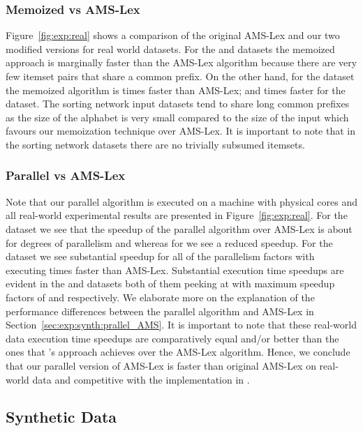 \documentclass[13pt,a4paper]{article}
\begin{document}
\subsubsection{Memoized vs AMS-Lex}

Figure~\ref{fig:exp:real} shows a comparison of the original AMS-Lex and our two modified versions for real world datasets. For the  and  datasets the memoized approach is marginally faster than the AMS-Lex algorithm because there are very few itemset pairs that share a common prefix. On the other hand, for the  dataset the memoized algorithm is  times faster than AMS-Lex; and  times faster for the  dataset. The sorting network input datasets tend to share long common prefixes as the size of the alphabet is very small compared to the size of the input which favours our memoization technique over AMS-Lex. It is important to note that in the sorting network datasets there are no trivially subsumed itemsets.

\subsubsection{Parallel vs AMS-Lex}

Note that our parallel algorithm is executed on a machine with  physical cores and all real-world experimental results are presented in Figure~\ref{fig:exp:real}. For the  dataset we see that the speedup of the parallel algorithm over AMS-Lex is about  for degrees of parallelism  and  whereas for  we see a reduced speedup. For the  dataset we see substantial speedup for all of the parallelism factors with  executing  times faster than AMS-Lex. Substantial execution time speedups are evident in the  and  datasets both of them peeking at  with maximum speedup factors of  and  respectively. We elaborate more on the explanation of the performance differences between the parallel algorithm and AMS-Lex in Section~\ref{sec:exp:synth:prallel_AMS}. It is important to note that these real-world data execution time speedups are comparatively equal and/or better than the ones that \cite{Fort+13}'s approach achieves over the AMS-Lex algorithm. Hence, we conclude that our parallel version of AMS-Lex is faster than original AMS-Lex on real-world data and competitive with the implementation in \cite{Fort+13}.


\subsection{Synthetic Data}
\label{sec:exp:synth}
\end{document}
